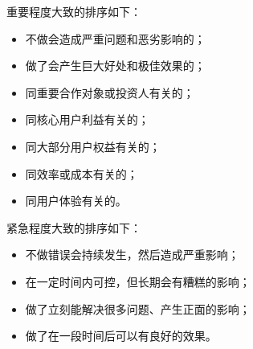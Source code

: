 \documentclass[letterpaper,11pt,english]{sphinxmanual}
\begin{document}
重要程度大致的排序如下：
%
\begin{footnote}[471]\sphinxAtStartFootnote
{}
%
\end{footnote}
\begin{itemize}
\item {} 
不做会造成严重问题和恶劣影响的；

\item {} 
做了会产生巨大好处和极佳效果的；

\item {} 
同重要合作对象或投资人有关的；

\item {} 
同核心用户利益有关的；

\item {} 
同大部分用户权益有关的；

\item {} 
同效率或成本有关的；

\item {} 
同用户体验有关的。

\end{itemize}

紧急程度大致的排序如下：
\begin{itemize}
\item {} 
不做错误会持续发生，然后造成严重影响；

\item {} 
在一定时间内可控，但长期会有糟糕的影响；

\item {} 
做了立刻能解决很多问题、产生正面的影响；

\item {} 
做了在一段时间后可以有良好的效果。

\end{itemize}
\end{document}

